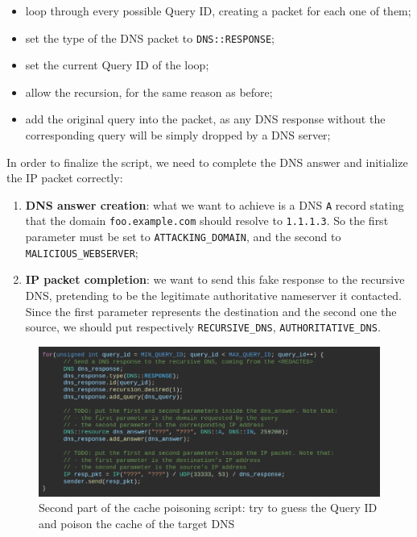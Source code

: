 \documentclass[11pt,a4paper]{article}
\begin{document}
\begin{itemize}
    \item loop through every possible Query ID, creating a packet for each one of them;
    \item set the type of the DNS packet to \texttt{DNS::RESPONSE};
    \item set the current Query ID of the loop;
    \item allow the recursion, for the same reason as before;
    \item add the original query into the packet, as any DNS response without the corresponding query will be simply dropped by a DNS server;
\end{itemize}

\noindent
In order to finalize the script, we need to complete the DNS answer and initialize the IP packet correctly:
\begin{enumerate}
    \item \textbf{DNS answer creation}: what we want to achieve is a DNS \texttt{A} record stating that the domain \texttt{foo.example.com} should resolve to \texttt{1.1.1.3}. So the first parameter must be set to \texttt{ATTACKING\_DOMAIN}, and the second to \texttt{MALICIOUS\_WEBSERVER};
    \item \textbf{IP packet completion}: we want to send this fake response to the recursive DNS, pretending to be the legitimate authoritative nameserver it contacted. Since the first parameter represents the destination and the second one the source, we should put respectively \texttt{RECURSIVE\_DNS}, \texttt{AUTHORITATIVE\_DNS}.
\end{enumerate}

\begin{figure}[h]
    \centering
    \includegraphics[width=\textwidth]{cache-poisoning-second.png}
    \caption{Second part of the cache poisoning script: try to guess the Query ID and poison the cache of the target DNS}
    \label{fig:cache-poisoning-second}
\end{figure}
\end{document}
